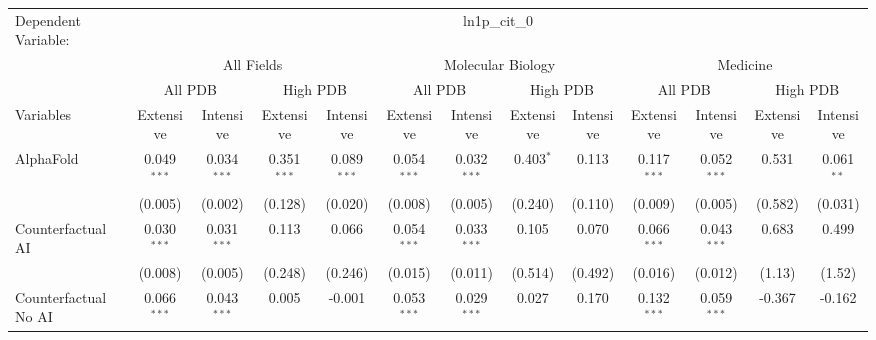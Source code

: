 \begingroup
\centering
\begin{tabular}{lcccccccccccc}
   \tabularnewline \midrule \midrule
   Dependent Variable: & \multicolumn{12}{c}{ln1p\_cit\_0}\\
 & \multicolumn{4}{c}{All Fields} & \multicolumn{4}{c}{Molecular Biology} & \multicolumn{4}{c}{Medicine} \\
\cmidrule(lr){2-5} \cmidrule(lr){6-9} \cmidrule(lr){10-13}
 & \multicolumn{2}{c}{All PDB} & \multicolumn{2}{c}{High PDB} & \multicolumn{2}{c}{All PDB} & \multicolumn{2}{c}{High PDB} & \multicolumn{2}{c}{All PDB} & \multicolumn{2}{c}{High PDB} \\
\cmidrule(lr){2-3} \cmidrule(lr){4-5} \cmidrule(lr){6-7} \cmidrule(lr){8-9} \cmidrule(lr){10-11} \cmidrule(lr){12-13}
Variables & \multicolumn{1}{c}{Extensive} & \multicolumn{1}{c}{Intensive} & \multicolumn{1}{c}{Extensive} & \multicolumn{1}{c}{Intensive} & \multicolumn{1}{c}{Extensive} & \multicolumn{1}{c}{Intensive} & \multicolumn{1}{c}{Extensive} & \multicolumn{1}{c}{Intensive} & \multicolumn{1}{c}{Extensive} & \multicolumn{1}{c}{Intensive} & \multicolumn{1}{c}{Extensive} & \multicolumn{1}{c}{Intensive} \\
\cmidrule(lr){1-1}\cmidrule(lr){2-2} \cmidrule(lr){3-3} \cmidrule(lr){4-4} \cmidrule(lr){5-5} \cmidrule(lr){6-6} \cmidrule(lr){7-7} \cmidrule(lr){8-8} \cmidrule(lr){9-9} \cmidrule(lr){10-10} \cmidrule(lr){11-11} \cmidrule(lr){12-12} \cmidrule(lr){13-13}
   AlphaFold                                & 0.049$^{***}$ & 0.034$^{***}$  & 0.351$^{***}$ & 0.089$^{***}$ & 0.054$^{***}$ & 0.032$^{***}$ & 0.403$^{*}$ & 0.113   & 0.117$^{***}$ & 0.052$^{***}$  & 0.531   & 0.061$^{**}$\\   
                                            & (0.005)       & (0.002)        & (0.128)       & (0.020)       & (0.008)       & (0.005)       & (0.240)     & (0.110) & (0.009)       & (0.005)        & (0.582) & (0.031)\\   
   Counterfactual AI                        & 0.030$^{***}$ & 0.031$^{***}$  & 0.113         & 0.066         & 0.054$^{***}$ & 0.033$^{***}$ & 0.105       & 0.070   & 0.066$^{***}$ & 0.043$^{***}$  & 0.683   & 0.499\\   
                                            & (0.008)       & (0.005)        & (0.248)       & (0.246)       & (0.015)       & (0.011)       & (0.514)     & (0.492) & (0.016)       & (0.012)        & (1.13)  & (1.52)\\   
   Counterfactual No AI                     & 0.066$^{***}$ & 0.043$^{***}$  & 0.005         & -0.001        & 0.053$^{***}$ & 0.029$^{***}$ & 0.027       & 0.170   & 0.132$^{***}$ & 0.059$^{***}$  & -0.367  & -0.162\\   

\end{tabular}
